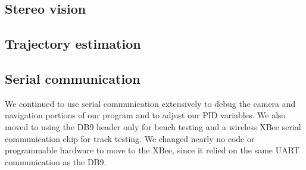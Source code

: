\documentclass[letterpaper, 11pt]{article}
\begin{document}
\begin{enumerate}[label=\textbf{\arabic*.}]
\subsection{Stereo vision}

\subsection{Trajectory estimation}

\subsection{Serial communication}
We continued to use serial communication extensively to debug the camera and navigation portions of our program and to adjust our PID variables. We also moved to using the DB9 header only for bench testing and a wireless XBee serial communication chip for track testing. We changed nearly no code or programmable hardware to move to the XBee, since it relied on the same UART communication as the DB9.


\end{enumerate}
\end{document}
